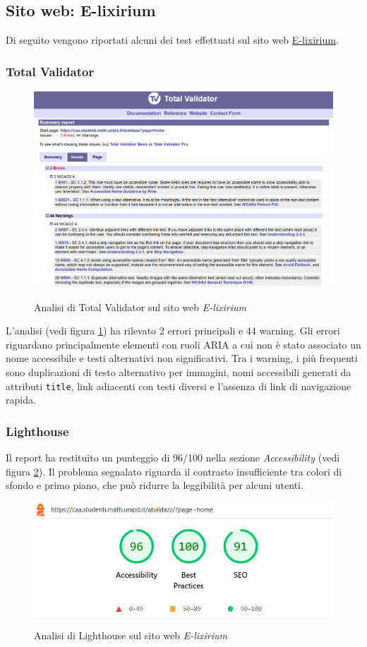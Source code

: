 \subsection{Sito web: E-lixirium}
\noindent Di seguito vengono riportati alcuni dei test effettuati sul sito web \href{https://caa.studenti.math.unipd.it/abaldazz/?page=home}{E-lixirium}.
\subsubsection{Total Validator}
\begin{figure}[H]
    \centering
    \includegraphics[width=0.8\linewidth, alt={Screenshot dell'analisi di Total Validator sul sito web E-lixirium}]{img/TV_elixirium.png}
    \caption{Analisi di Total Validator sul sito web \textit{E-lixirium}}\label{fig:TV_elixirium}
\end{figure}

\noindent L'analisi (vedi figura \ref{fig:TV_elixirium}) ha rilevato 2 errori principali e 44 warning. 
Gli errori riguardano principalmente elementi con ruoli ARIA a cui non è stato associato un nome accessibile e testi alternativi non significativi. Tra i warning, i più frequenti sono duplicazioni di testo alternativo per immagini, nomi accessibili generati da attributi \texttt{title}, link adiacenti con testi diversi e l’assenza di link di navigazione rapida. 

\subsubsection{Lighthouse}
\noindent Il report ha restituito un punteggio di 96/100 nella sezione \textit{Accessibility} (vedi figura \ref{fig:Lighthouse_elixirium}). 
Il problema segnalato riguarda il contrasto insufficiente tra colori di sfondo e primo piano, che può ridurre la leggibilità per alcuni utenti. 
\begin{figure}[H]
    \centering
    \includegraphics[width=0.6\linewidth, alt={Screenshot dell'analisi di Lighthouse sul sito web E-lixirium}]{img/Lighthouse_elixirium.png}
    \caption{Analisi di Lighthouse sul sito web \textit{E-lixirium}}\label{fig:Lighthouse_elixirium}
\end{figure}

